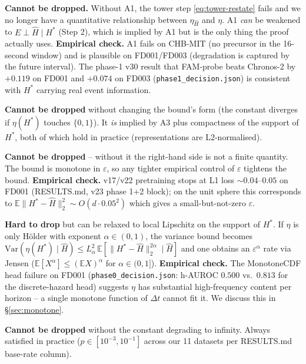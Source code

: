 \documentclass[11pt]{article}
\newcommand{\E}{\mathbb{E}}
\newcommand{\Var}{\mathrm{Var}}
\begin{document}
\begin{description}[leftmargin=2em,style=nextline]
\item[A1 (target sufficiency).]
\textbf{Cannot be dropped.}
Without A1, the tower step \eqref{eq:tower-restate} fails and we no
longer have a quantitative relationship between $\eta_{\hat H}$ and
$\eta$. A1 \emph{can} be weakened to $E\perp\hat H\mid H^*$ (Step 2),
which is implied by A1 but is the only thing the proof actually uses.
\textbf{Empirical check.} A1 fails on CHB-MIT (no precursor in the
16-second window) and is plausible on FD001/FD003 (degradation is
captured by the future interval). The phase-1 v30 result that FAM-probe
beats Chronos-2 by $+0.119$ on FD001 and $+0.074$ on FD003
(\texttt{phase1\_decision.json}) is consistent with $H^*$ carrying real
event information.

\item[A1$'$ (calibrated posterior, our addition).]
\textbf{Cannot be dropped} without changing the bound's form (the constant
diverges if $\eta(H^*)$ touches $\{0,1\}$). It \emph{is} implied by
A3 plus compactness of the support of $H^*$, both of which hold in
practice (representations are L2-normalised).

\item[A2 (bounded prediction error).]
\textbf{Cannot be dropped} -- without it the right-hand side is not a
finite quantity. The bound is monotone in $\varepsilon$, so any tighter
empirical control of $\varepsilon$ tightens the bound.
\textbf{Empirical check.} v17/v22 pretraining stops at L1 loss
$\sim 0.04$--$0.05$ on FD001 (RESULTS.md, v23 phase 1+2 block); on the
unit sphere this corresponds to $\E\|H^*-\hat H\|_2^2\sim O(d\cdot
0.05^2)$ which gives a small-but-not-zero $\varepsilon$.

\item[A3 (Lipschitz $\eta$).]
\textbf{Hard to drop} but can be relaxed to local Lipschitz on the support
of $H^*$. If $\eta$ is only H\"older with exponent $\alpha\in(0,1)$, the
variance bound becomes
$\Var(\eta(H^*)\mid\hat H)\le L_\alpha^2\,\E[\|H^*-\hat H\|_2^{2\alpha}\mid\hat H]$
and one obtains an $\varepsilon^{\alpha}$ rate via Jensen ($\E[X^\alpha]
\le (\E X)^\alpha$ for $\alpha\in(0,1]$).
\textbf{Empirical check.} The MonotoneCDF head failure on FD001
(\texttt{phase0\_decision.json}: h-AUROC $0.500$ vs.\ $0.813$ for the
discrete-hazard head) suggests $\eta$ has substantial high-frequency
content per horizon -- a single monotone function of $\Delta t$ cannot
fit it. We discuss this in \S\ref{sec:monotone}.

\item[A4 (bounded marginal event rate).]
\textbf{Cannot be dropped} without the constant degrading to infinity.
Always satisfied in practice ($p\in[10^{-3},10^{-1}]$ across our 11
datasets per RESULTS.md base-rate column).
\end{description}
\end{document}
